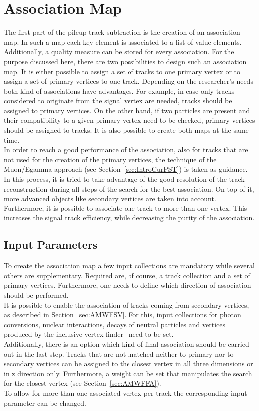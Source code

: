 \chapter{Association Map \label{sec:AssMap}}

The first part of the pileup track subtraction is the creation of an association map. In such a map each key element is associated to a list of value elements. Additionally, a quality measure can be stored for every association. For the purpose discussed here, there are two possibilities to design such an association map. It is either possible to assign a set of tracks to one primary vertex or to assign a set of primary vertices to one track. Depending on the researcher's needs both kind of associations have advantages. For example, in case only tracks considered to originate from the signal vertex are needed, tracks should be assigned to primary vertices. On the other hand, if two particles are present and their compatibility to a given  primary vertex need to be checked, primary vertices should be assigned to tracks. It is also possible to create both maps at the same time.\\
In order to reach a good performance of the association, also for tracks that are not used for the creation of the primary vertices, the technique of the Muon/Egamma approach (see Section~\ref{sec:IntroCurPST}) is taken as guidance. In this process, it is tried to take advantage of the good resolution of the track reconstruction during all steps of the search for the best association. On top of it, more advanced objects like secondary vertices are taken into account.\\
Furthermore, it is possible to associate one track to more than one vertex. This increases the signal track efficiency, while decreasing the purity of the association.

\section{Input Parameters \label{sec:AMInColl}}

To create the association map a few input collections are mandatory while several others are supplementary. Required are, of course, a track collection and a set of primary vertices. Furthermore, one needs to define which direction of association should be performed. \\
It is possible to enable the association of tracks coming from secondary vertices, as described in Section~\ref{sec:AMWFSV}. For this, input collections for photon conversions, nuclear interactions, decays of neutral particles and vertices produced by the inclusive vertex finder~\cite{ivfPaper} need to be set. \\
Additionally, there is an option which kind of final association should be carried out in the last step. Tracks that are not matched neither to primary nor to secondary vertices can be assigned to the closest vertex in all three dimensions or in z direction only. Furthermore, a weight can be set that manipulates the search for the closest vertex (see Section~\ref{sec:AMWFFA}). \\
To allow for more than one associated vertex per track the corresponding input parameter can be changed.


